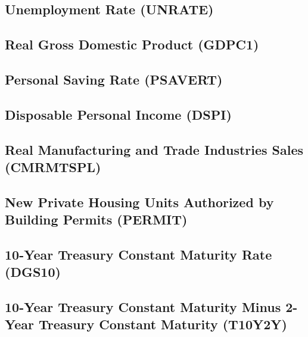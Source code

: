 \documentclass[]{book}
\begin{document}
\hypertarget{unemployment-rate-unrate-1}{%
\subsection{Unemployment Rate (UNRATE)}\label{unemployment-rate-unrate-1}}

\hypertarget{real-gross-domestic-product-gdpc1-1}{%
\subsection{Real Gross Domestic Product (GDPC1)}\label{real-gross-domestic-product-gdpc1-1}}

\hypertarget{personal-saving-rate-psavert}{%
\subsection{Personal Saving Rate (PSAVERT)}\label{personal-saving-rate-psavert}}

\hypertarget{disposable-personal-income-dspi}{%
\subsection{Disposable Personal Income (DSPI)}\label{disposable-personal-income-dspi}}

\hypertarget{real-manufacturing-and-trade-industries-sales-cmrmtspl}{%
\subsection{Real Manufacturing and Trade Industries Sales (CMRMTSPL)}\label{real-manufacturing-and-trade-industries-sales-cmrmtspl}}

\hypertarget{new-private-housing-units-authorized-by-building-permits-permit}{%
\subsection{New Private Housing Units Authorized by Building Permits (PERMIT)}\label{new-private-housing-units-authorized-by-building-permits-permit}}

\hypertarget{year-treasury-constant-maturity-rate-dgs10-1}{%
\subsection{10-Year Treasury Constant Maturity Rate (DGS10)}\label{year-treasury-constant-maturity-rate-dgs10-1}}

\hypertarget{year-treasury-constant-maturity-minus-2-year-treasury-constant-maturity-t10y2y}{%
\subsection{10-Year Treasury Constant Maturity Minus 2-Year Treasury Constant Maturity (T10Y2Y)}\label{year-treasury-constant-maturity-minus-2-year-treasury-constant-maturity-t10y2y}}
\end{document}
